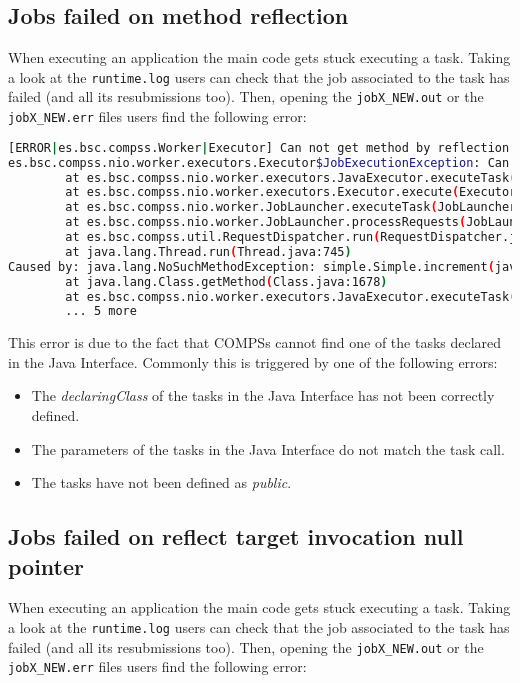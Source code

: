 
\subsection{Jobs failed on method reflection}
When executing an application the main code gets stuck executing a task. Taking a look at the \texttt{runtime.log} users can check
that the job associated to the task has failed (and all its resubmissions too). Then, opening the \texttt{jobX\_NEW.out} or the
\texttt{jobX\_NEW.err} files users find the following error:

\begin{lstlisting}[language=bash]
[ERROR|es.bsc.compss.Worker|Executor] Can not get method by reflection
es.bsc.compss.nio.worker.executors.Executor$JobExecutionException: Can not get method by reflection
        at es.bsc.compss.nio.worker.executors.JavaExecutor.executeTask(JavaExecutor.java:142)
        at es.bsc.compss.nio.worker.executors.Executor.execute(Executor.java:42)
        at es.bsc.compss.nio.worker.JobLauncher.executeTask(JobLauncher.java:46)
        at es.bsc.compss.nio.worker.JobLauncher.processRequests(JobLauncher.java:34)
        at es.bsc.compss.util.RequestDispatcher.run(RequestDispatcher.java:46)
        at java.lang.Thread.run(Thread.java:745)
Caused by: java.lang.NoSuchMethodException: simple.Simple.increment(java.lang.String)
        at java.lang.Class.getMethod(Class.java:1678)
        at es.bsc.compss.nio.worker.executors.JavaExecutor.executeTask(JavaExecutor.java:140)
        ... 5 more
\end{lstlisting}

This error is due to the fact that COMPSs cannot find one of the tasks declared in the Java Interface. Commonly this is triggered by
one of the following errors:

\begin{itemize}
 \item The \textit{declaringClass} of the tasks in the Java Interface has not been correctly defined.
 \item The parameters of the tasks in the Java Interface do not match the task call.
 \item The tasks have not been defined as \textit{public}.
\end{itemize}

\subsection{Jobs failed on reflect target invocation null pointer}
When executing an application the main code gets stuck executing a task. Taking a look at the \texttt{runtime.log} users can check
that the job associated to the task has failed (and all its resubmissions too). Then, opening the \texttt{jobX\_NEW.out} or the
\texttt{jobX\_NEW.err} files users find the following error:

